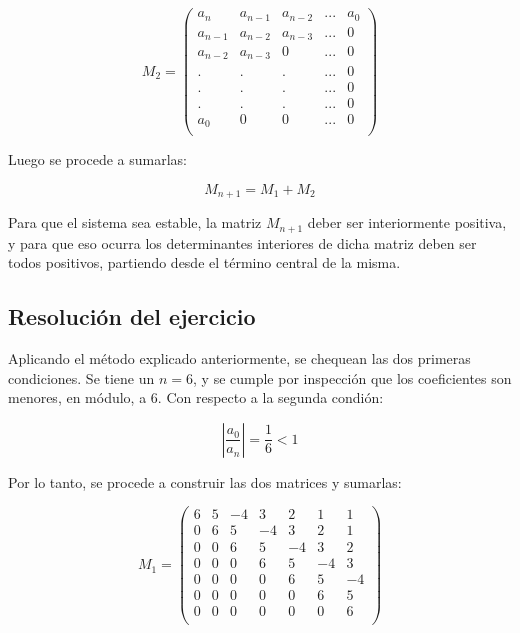 \begin{equation}\label{eq:matriz2}
    M_2 = \begin{pmatrix}
            a_n & a_{n - 1} & a_{n -2} & ... & a_0\\
            a_{n - 1}       & a_{n - 2}& a_{n - 3}& ... & 0\\
            a_{n - 2}       & a_{n - 3}&  0       & ... & 0\\
            .               & .        & .        & ... & 0\\
            .               & .        & .        & ... & 0\\
            .               & .        & .        & ... & 0\\
            a_0             & 0        & 0        & ... & 0\\
            
            \end{pmatrix}
\end{equation}

Luego se procede a sumarlas:

\begin{equation}
    M_{n + 1} = M_1 + M_2
\end{equation}

Para que el sistema sea estable, la matriz $M_{n + 1}$ deber ser interiormente positiva, y para que eso ocurra los determinantes interiores de dicha matriz deben ser todos positivos, partiendo desde el t\'ermino central de la misma.

\subsection{Resoluci\'on del ejercicio}

Aplicando el m\'etodo explicado anteriormente, se chequean las dos primeras condiciones. Se tiene un $n = 6$, y se cumple por inspecci\'on que los coeficientes son menores, en m\'odulo, a $6$. Con respecto a la segunda condi\'on:

\begin{equation}
    |\frac{a_0}{a_n}| = \frac{1}{6} < 1
\end{equation}

Por lo tanto, se procede a construir las dos matrices y sumarlas:

\begin{equation}
    M_1 = \begin{pmatrix}
    6 & 5 & -4 & 3 & 2 & 1  & 1 \\
    0 & 6 & 5 & -4 & 3 & 2  & 1 \\
    0 & 0 & 6 & 5  & -4& 3  & 2 \\
    0 & 0 & 0 & 6  & 5 & -4 & 3 \\
    0 & 0 & 0 & 0  & 6 & 5  & -4\\
    0 & 0 & 0 & 0  & 0 & 6  & 5 \\
    0 & 0 & 0 & 0  & 0 & 0 & 6  \\
            
    \end{pmatrix}
\end{equation}


